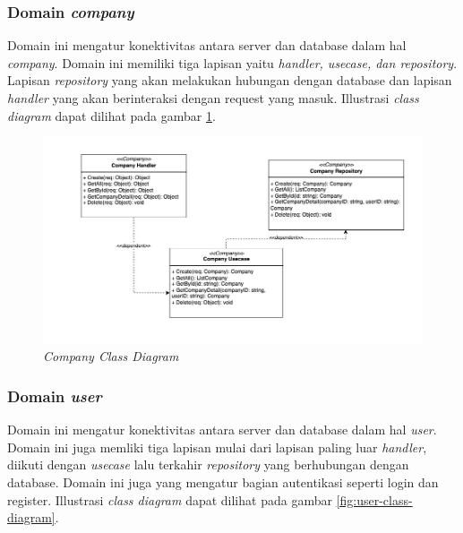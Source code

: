 \pagebreak

\subsubsection{Domain \textit{company}}

Domain ini mengatur konektivitas antara server dan database dalam hal \textit{company}. Domain ini memiliki tiga lapisan yaitu \textit{handler, usecase, dan repository}. Lapisan \textit{repository} yang akan melakukan hubungan dengan database dan lapisan \textit{handler} yang akan berinteraksi dengan request yang masuk. Illustrasi \textit{class diagram} dapat dilihat pada gambar \ref{fig:company-class-diagram}.

\begin{figure}[ht]
  \centering
  \includegraphics[width=1\textwidth]{resources/chapter-3/class/company-class-diagram.jpg}
  \caption{\textit{Company Class Diagram}}
  \label{fig:company-class-diagram}
\end{figure}

\pagebreak

\subsubsection{Domain \textit{user}}

Domain ini mengatur konektivitas antara server dan database dalam hal \textit{user}. Domain ini juga memliki tiga lapisan mulai dari lapisan paling luar \textit{handler}, diikuti dengan \textit{usecase} lalu terkahir \textit{repository} yang berhubungan dengan database. Domain ini juga yang mengatur bagian autentikasi seperti login dan register. Illustrasi \textit{class diagram} dapat dilihat pada gambar \ref{fig:user-class-diagram}.

